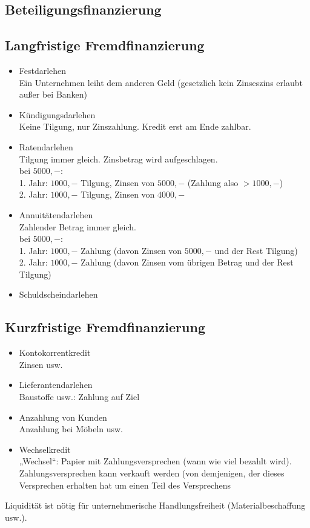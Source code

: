 \documentclass{scrreprt}
\begin{document}
\subsection{Beteiligungsfinanzierung}
\subsection{Langfristige Fremdfinanzierung}
\begin{itemize}
\item Festdarlehen\\
Ein Unternehmen leiht dem anderen Geld (gesetzlich kein Zinseszins erlaubt außer bei Banken)
\item Kündigungsdarlehen\\
Keine Tilgung, nur Zinszahlung. Kredit erst am Ende zahlbar.
\item Ratendarlehen\\
Tilgung immer gleich. Zinsbetrag wird aufgeschlagen.\\
bei $5000,-$:\\
1. Jahr: $1000,-$ Tilgung, Zinsen von $5000,-$ (Zahlung also $>1000,-$)\\
2. Jahr: $1000,-$ Tilgung, Zinsen von $4000,-$
\item Annuitätendarlehen\\
Zahlender Betrag immer gleich.\\
bei $5000,-$:\\
1. Jahr: $1000,-$ Zahlung (davon Zinsen von $5000,-$ und der Rest Tilgung)\\
2. Jahr: $1000,-$ Zahlung (davon Zinsen vom übrigen Betrag und der Rest Tilgung)
\item Schuldscheindarlehen
\end{itemize}

\subsection{Kurzfristige Fremdfinanzierung}
\begin{itemize}
\item Kontokorrentkredit\\
Zinsen usw.
\item Lieferantendarlehen\\
Baustoffe usw.: Zahlung auf Ziel
\item Anzahlung von Kunden\\
Anzahlung bei Möbeln usw.
\item Wechselkredit\\
„Wechsel“: Papier mit Zahlungsversprechen (wann wie viel bezahlt wird). Zahlungsversprechen kann verkauft werden (von demjenigen, der dieses Versprechen erhalten hat um einen Teil des Versprechens
\end{itemize}
Liquidität ist nötig für unternehmerische Handlungsfreiheit (Materialbeschaffung usw.).
\end{document}
